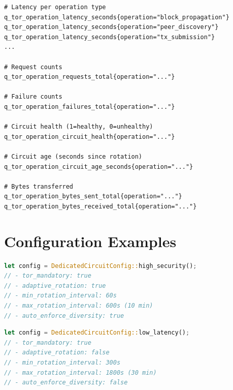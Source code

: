 \documentclass[11pt,a4paper]{article}
\begin{document}
\begin{lstlisting}[caption=Per-Operation Metrics]
# Latency per operation type
q_tor_operation_latency_seconds{operation="block_propagation"}
q_tor_operation_latency_seconds{operation="peer_discovery"}
q_tor_operation_latency_seconds{operation="tx_submission"}
...

# Request counts
q_tor_operation_requests_total{operation="..."}

# Failure counts
q_tor_operation_failures_total{operation="..."}

# Circuit health (1=healthy, 0=unhealthy)
q_tor_operation_circuit_health{operation="..."}

# Circuit age (seconds since rotation)
q_tor_operation_circuit_age_seconds{operation="..."}

# Bytes transferred
q_tor_operation_bytes_sent_total{operation="..."}
q_tor_operation_bytes_received_total{operation="..."}
\end{lstlisting}

\section{Configuration Examples}

\begin{lstlisting}[language=Rust, caption=High Security Configuration]
let config = DedicatedCircuitConfig::high_security();
// - tor_mandatory: true
// - adaptive_rotation: true
// - min_rotation_interval: 60s
// - max_rotation_interval: 600s (10 min)
// - auto_enforce_diversity: true
\end{lstlisting}

\begin{lstlisting}[language=Rust, caption=Low Latency Configuration]
let config = DedicatedCircuitConfig::low_latency();
// - tor_mandatory: true
// - adaptive_rotation: false
// - min_rotation_interval: 300s
// - max_rotation_interval: 1800s (30 min)
// - auto_enforce_diversity: false
\end{lstlisting}
\end{document}
